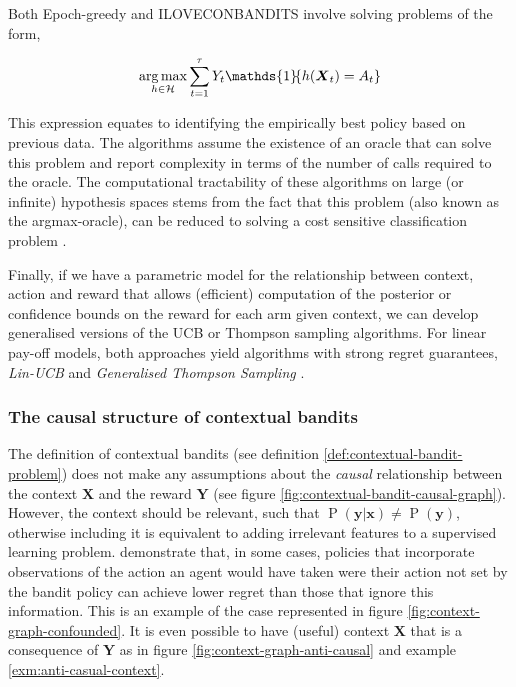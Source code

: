 \documentclass[11pt,a4paper,twoside]{report}
\newcommand{\set}[1]{\left\{#1\right\}}
\newcommand{\ind}[1]{\mathds{1}\!\!\set{#1}}
\newcommand{\argmax}{\operatornamewithlimits{arg\,max}}
\newcommand{\eqn}[1]{\begin{align}#1\end{align}}
\renewcommand{\P}[1]{\operatorname{P}\left(#1\right)}
\renewcommand{\vec}[1]{\boldsymbol{#1}}
\theoremstyle{plain}
\theoremstyle{definition}
\begin{document}
Both Epoch-greedy and ILOVECONBANDITS involve solving problems of the form,

\eqn{
\argmax_{h \in \mathcal{H}} \sum_{t=1}^\tau Y_t \ind{h(\vec{X}_t) = A_t}
}

This expression equates to identifying the empirically best policy based on previous data. The algorithms assume the existence of an oracle that can solve this problem and report complexity in terms of the number of calls required to the oracle. The computational tractability of these algorithms on large (or infinite) hypothesis spaces stems from the fact that this problem (also known as the argmax-oracle), can be reduced to solving a cost sensitive classification problem \citep{Dudik2011a}. 

Finally, if we have a parametric model for the relationship between context, action and reward that allows (efficient) computation of the posterior or confidence bounds on the reward for each arm given context, we can develop generalised versions of the UCB or Thompson sampling algorithms. For linear pay-off models, both approaches yield algorithms with strong regret guarantees, \emph{Lin-UCB} \citep{li2010contextual} and \emph{Generalised Thompson Sampling} \citep{Agrawal2013}. 

\subsubsection{The causal structure of contextual bandits}
\label{sec:causal-structure-contextual-bandit}

The definition of contextual bandits (see definition \ref{def:contextual-bandit-problem}) does not make any assumptions about the \emph{causal} relationship between the context $\vec{X}$ and the reward $\vec{Y}$ (see figure \ref{fig:contextual-bandit-causal-graph}). However, the context should be relevant, such that $\P{\vec{y}|\vec{x}} \neq \P{\vec{y}}$, otherwise including it is equivalent to adding irrelevant features to a supervised learning problem. \citet{Bareinboim2015} demonstrate that, in some cases, policies that incorporate observations of the action an agent would have taken were their action not set by the bandit policy can achieve lower regret than those that ignore this information. This is an example of the case represented in figure \ref{fig:context-graph-confounded}. It is even possible to have (useful) context $\vec{X}$ that is a consequence of $\vec{Y}$ as in figure \ref{fig:context-graph-anti-causal} and example \ref{exm:anti-casual-context}.
\end{document}
